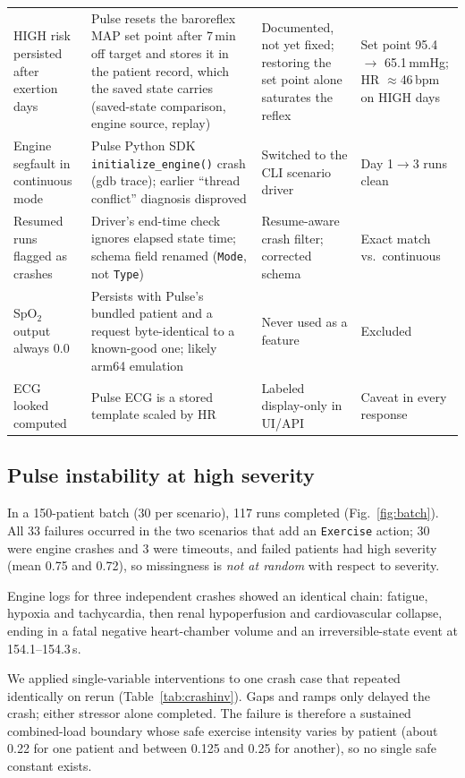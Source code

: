 \documentclass[conference]{IEEEtran}
\newcommand{\code}[1]{\texttt{\footnotesize #1}}
\begin{document}
\begin{table}[!t]
\begin{tabularx}{\textwidth}{@{}P{3.1cm}YYP{2.6cm}@{}}
HIGH risk persisted after exertion days & Pulse resets the baroreflex MAP set point after 7\,min off target and stores it in the patient record, which the saved state carries (saved-state comparison, engine source, replay) & Documented, not yet fixed; restoring the set point alone saturates the reflex & Set point 95.4 $\rightarrow$ 65.1\,mmHg; HR $\approx$46\,bpm on HIGH days \\
Engine segfault in continuous mode & Pulse Python SDK \code{initialize\_engine()} crash (gdb trace); earlier ``thread conflict'' diagnosis disproved & Switched to the CLI scenario driver & Day 1$\rightarrow$3 runs clean \\
Resumed runs flagged as crashes & Driver's end-time check ignores elapsed state time; schema field renamed (\code{Mode}, not \code{Type}) & Resume-aware crash filter; corrected schema & Exact match vs.\ continuous \\
SpO$_2$ output always 0.0 & Persists with Pulse's bundled patient and a request byte-identical to a known-good one; likely arm64 emulation & Never used as a feature & Excluded \\
ECG looked computed & Pulse ECG is a stored template scaled by HR & Labeled display-only in UI/API & Caveat in every response \\
\bottomrule
\end{tabularx}
\end{table}

\subsection{Pulse instability at high severity}
In a 150-patient batch (30 per scenario), 117 runs completed (Fig.~\ref{fig:batch}). All 33 failures occurred in the two scenarios that add an \code{Exercise} action; 30 were engine crashes and 3 were timeouts, and failed patients had high severity (mean 0.75 and 0.72), so missingness is \emph{not at random} with respect to severity.

Engine logs for three independent crashes showed an identical chain: fatigue, hypoxia and tachycardia, then renal hypoperfusion and cardiovascular collapse, ending in a fatal negative heart-chamber volume and an irreversible-state event at 154.1--154.3\,s.

We applied single-variable interventions to one crash case that repeated identically on rerun (Table~\ref{tab:crashinv}). Gaps and ramps only delayed the crash; either stressor alone completed. The failure is therefore a sustained combined-load boundary whose safe exercise intensity varies by patient (about 0.22 for one patient and between 0.125 and 0.25 for another), so no single safe constant exists.
\end{document}
